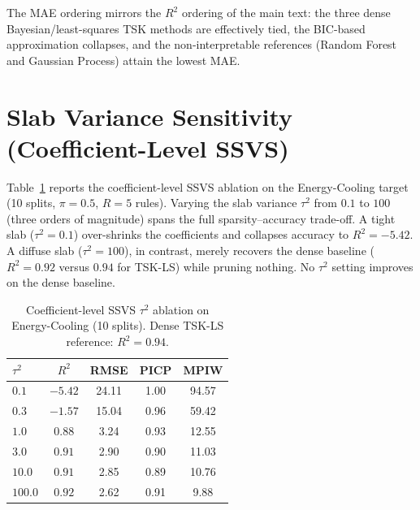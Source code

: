 \documentclass[review,1p,times]{elsarticle}
\begin{document}
The MAE ordering mirrors the $R^2$ ordering of the main text: the three dense Bayesian/least-squares TSK methods are effectively tied, the BIC-based approximation collapses, and the non-interpretable references (Random Forest and Gaussian Process) attain the lowest MAE.

\FloatBarrier

\section{Slab Variance Sensitivity (Coefficient-Level SSVS)}

Table~\ref{tab:tau2} reports the coefficient-level SSVS ablation on the Energy-Cooling target (10 splits, $\pi=0.5$, $R=5$ rules).
Varying the slab variance $\tau^2$ from $0.1$ to $100$ (three orders of magnitude) spans the full sparsity--accuracy trade-off.
A tight slab ($\tau^2=0.1$) over-shrinks the coefficients and collapses accuracy to $R^2=-5.42$.
A diffuse slab ($\tau^2=100$), in contrast, merely recovers the dense baseline ($R^2=0.92$ versus $0.94$ for TSK-LS) while pruning nothing. No $\tau^2$ setting improves on the dense baseline.

\begin{table}[htbp]
\centering
\caption{Coefficient-level SSVS $\tau^2$ ablation on Energy-Cooling (10 splits). Dense TSK-LS reference: $R^2=0.94$.}
\label{tab:tau2}
\footnotesize
\begin{tabular}{lcccc}
\toprule
$\tau^2$ & $R^2$ & RMSE & PICP & MPIW \\
\midrule
$0.1$   & $-5.42$ & 24.11 & 1.00 & 94.57 \\
$0.3$   & $-1.57$ & 15.04 & 0.96 & 59.42 \\
$1.0$   & $0.88$  & 3.24  & 0.93 & 12.55 \\
$3.0$   & $0.91$  & 2.90  & 0.90 & 11.03 \\
$10.0$  & $0.91$  & 2.85  & 0.89 & 10.76 \\
$100.0$ & $0.92$  & 2.62  & 0.91 & 9.88 \\
\bottomrule
\end{tabular}
\end{table}
\end{document}
